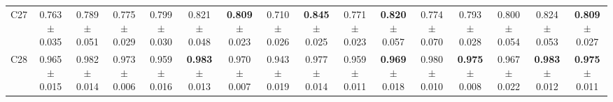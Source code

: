\documentclass[11pt]{article}
\begin{document}
\begin{table}
{\begin{tabular}{lccccccccccccccc}
C27 & 0.763 $\pm$ 0.035 & 0.789 $\pm$ 0.051 & 0.775 $\pm$ 0.029 & 0.799 $\pm$ 0.030 & 0.821 $\pm$ 0.048 & \textbf{0.809} $\pm$ 0.023 & 0.710 $\pm$ 0.026 & \textbf{0.845} $\pm$ 0.025 & 0.771 $\pm$ 0.023 & \textbf{0.820} $\pm$ 0.057 & 0.774 $\pm$ 0.070 & 0.793 $\pm$ 0.028 & 0.800 $\pm$ 0.054 & 0.824 $\pm$ 0.053 & \textbf{0.809} $\pm$ 0.027 \\
C28 & 0.965 $\pm$ 0.015 & 0.982 $\pm$ 0.014 & 0.973 $\pm$ 0.006 & 0.959 $\pm$ 0.016 & \textbf{0.983} $\pm$ 0.013 & 0.970 $\pm$ 0.007 & 0.943 $\pm$ 0.019 & 0.977 $\pm$ 0.014 & 0.959 $\pm$ 0.011 & \textbf{0.969} $\pm$ 0.018 & 0.980 $\pm$ 0.010 & \textbf{0.975} $\pm$ 0.008 & 0.967 $\pm$ 0.022 & \textbf{0.983} $\pm$ 0.012 & \textbf{0.975} $\pm$ 0.011 \\
\bottomrule
\end{tabular}%
}
\end{table}

\clearpage
\end{document}
